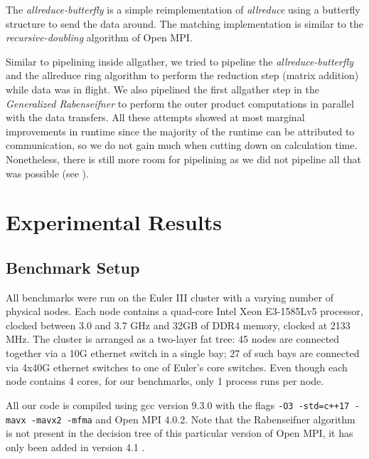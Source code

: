 \documentclass[letterpaper]{article}
\newcommand{\code}{\textit}
\newcommand{\grabenseifner}{\textit{Generalized Rabenseifner}}
\begin{document}
The \code{allreduce-butterfly} is a simple reimplementation of \code{allreduce} using a butterfly structure to send the data around. The matching implementation is similar to the \code{recursive-doubling} algorithm of Open MPI.

Similar to pipelining inside allgather, we tried to pipeline the \code{allreduce-butterfly} and the allreduce ring algorithm to perform the reduction step (matrix addition) while data was in flight. We also pipelined the first allgather step in the \grabenseifner{} to perform the outer product computations in parallel with the data transfers. All these attempts showed at most marginal improvements in runtime since the majority of the runtime can be attributed to communication, so we do not gain much when cutting down on calculation time. Nonetheless, there is still more room for pipelining as we did not pipeline all that was possible (see ).


\section{Experimental Results}

\subsection{Benchmark Setup}

All benchmarks were run on the Euler III cluster with a varying number of physical nodes. Each node contains a quad-core Intel Xeon E3-1585Lv5 processor, clocked between 3.0 and 3.7 GHz and 32GB of DDR4 memory, clocked at 2133 MHz. The cluster is arranged as a two-layer fat tree: 45 nodes are connected together via a 10G ethernet switch in a single bay; 27 of such bays are connected via 4x40G ethernet switches to one of Euler's core switches. Even though each node contains 4 cores, for our benchmarks, only 1 process runs per node.

All our code is compiled using gcc version 9.3.0 with the flags \texttt{-O3 -std=c++17 -mavx -mavx2 -mfma} and Open MPI 4.0.2. Note that the Rabenseifner algorithm is not present in the decision tree of this particular version of Open MPI, it has only been added in version 4.1 \cite{openMPI_git, openMPI_decision_tree_4_0_2, openMPI_decision_tree_4_1_2}.
\end{document}
